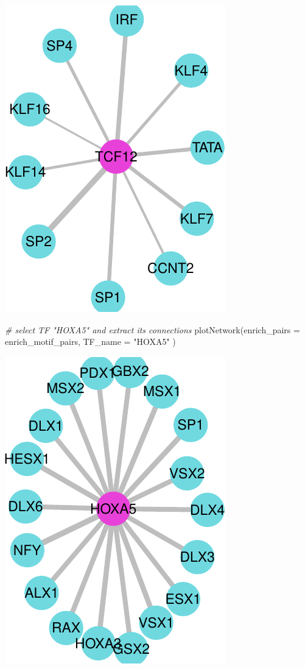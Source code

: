 \documentclass[
]{article}
\newenvironment{Shaded}{}{}
\newcommand{\AttributeTok}[1]{\textcolor[rgb]{0.49,0.56,0.16}{#1}}
\newcommand{\CommentTok}[1]{\textcolor[rgb]{0.38,0.63,0.69}{\textit{#1}}}
\newcommand{\FunctionTok}[1]{\textcolor[rgb]{0.02,0.16,0.49}{#1}}
\newcommand{\NormalTok}[1]{#1}
\newcommand{\StringTok}[1]{\textcolor[rgb]{0.25,0.44,0.63}{#1}}
\begin{document}
\includegraphics{enrichmotifpairR_user_manual_guide_files/figure-latex/Th17_treated_vs_untreated_6-2.pdf}

\begin{Shaded}
\begin{Highlighting}[]

\CommentTok{\# select TF "HOXA5" and extract its connections}
\FunctionTok{plotNetwork}\NormalTok{(}\AttributeTok{enrich\_pairs =}\NormalTok{ enrich\_motif\_pairs, }
            \AttributeTok{TF\_name =} \StringTok{"HOXA5"}
\NormalTok{            )}
\end{Highlighting}
\end{Shaded}

\includegraphics{enrichmotifpairR_user_manual_guide_files/figure-latex/Th17_treated_vs_untreated_6-3.pdf}
\end{document}
